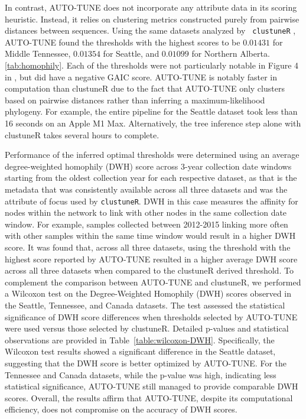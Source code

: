 \documentclass[utf8]{FrontiersinHarvard} %
\begin{document}
In contrast, AUTO-TUNE does not incorporate any attribute data in its scoring
heuristic. Instead, it relies on clustering metrics constructed purely from
pairwise distances between sequences. Using the same datasets analyzed by {\tt
clustuneR} \citep{chato_public_2020}, AUTO-TUNE found the thresholds with the
highest scores to be $0.01431$ for Middle Tennessee, $0.01354$ for Seattle, and
$0.01099$ for Northern Alberta. \autoref{tab:homophily}. Each of the thresholds
were not particularly notable in Figure 4 in \cite{chato_public_2020}, but did
have a negative GAIC score. AUTO-TUNE is notably faster in computation than
clustuneR due to the fact that AUTO-TUNE only clusters based on pairwise
distances rather than inferring a maximum-likelihood phylogeny. For example, the
entire pipeline for the Seattle dataset took less than 16 seconds on an Apple M1
Max. Alternatively, the tree inference step alone with clustuneR takes several
hours to complete.

Performance of the inferred optimal thresholds were determined using an average
degree-weighted homophily (DWH) score across 3-year collection date windows
starting from the oldest collection year for each respective dataset, as that is
the metadata that was consistently available across all three datasets and was
the attribute of focus used by {\tt clustuneR}. DWH in this case measures the
affinity for nodes within the network to link with other nodes in the same
collection date window. For example, samples collected between 2012-2015 linking
more often with other samples within the same time window would result in a
higher DWH score. It was found that, across all three datasets, using the
threshold with the highest score reported by AUTO-TUNE resulted in a higher
average DWH score across all three datasets when compared to the clustuneR
derived threshold. To complement the comparison between AUTO-TUNE and clustuneR,
we performed a Wilcoxon test on the Degree-Weighted Homophily (DWH) scores
observed in the Seattle, Tennessee, and Canada datasets. The test assessed the
statistical significance of DWH score differences when thresholds selected by
AUTO-TUNE were used versus those selected by clustuneR. Detailed p-values and
statistical observations are provided in Table~\ref{table:wilcoxon-DWH}.
Specifically, the Wilcoxon test results showed a significant difference in the
Seattle dataset, suggesting that the DWH score is better optimized by AUTO-TUNE.
For the Tennessee and Canada datasets, while the p-value was high, indicating
less statistical significance, AUTO-TUNE still managed to provide comparable DWH
scores. Overall, the results affirm that AUTO-TUNE, despite its computational
efficiency, does not compromise on the accuracy of DWH scores.
\end{document}
